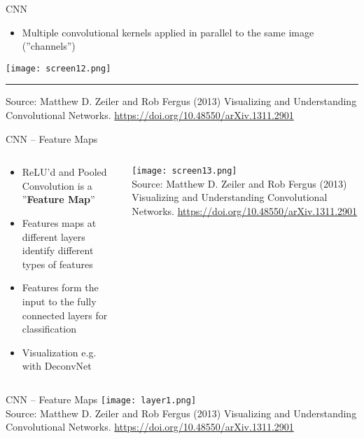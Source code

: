 \documentclass[ignorenonframetext,xcolor=x11names]{beamer}
\begin{document}
\begin{frame}{CNN}
\begin{itemize}
   \item Multiple convolutional kernels applied in parallel to the same image (''channels'')
\end{itemize} 

\vspace{\baselineskip}

\centering
\texttt{[image: screen12.png]} \\
\vspace{\baselineskip}

\hrule

\vspace{\baselineskip}
\scriptsize Source: Matthew D. Zeiler and Rob Fergus (2013) Visualizing and Understanding Convolutional Networks. \url{https://doi.org/10.48550/arXiv.1311.2901}
\end{frame}

\begin{frame}{CNN -- Feature Maps}
\begin{columns}
\begin{column}{0.5\textwidth}
\begin{itemize}
   \item ReLU'd and Pooled Convolution is a ''\textbf{Feature Map}''
   \item Features maps at different layers identify different types of features
   \item Features form the input to the fully connected layers for classification
   \item Visualization e.g. with DeconvNet
\end{itemize}
\end{column}
\begin{column}{0.5\textwidth}
\centering
\texttt{[image: screen13.png]} \\

\vspace{\baselineskip}
\scriptsize Source: Matthew D. Zeiler and Rob Fergus (2013) Visualizing and Understanding Convolutional Networks. \url{https://doi.org/10.48550/arXiv.1311.2901}
\end{column}
\end{columns}
\end{frame}

\begin{frame}{CNN -- Feature Maps}
\centering
\texttt{[image: layer1.png]} \\
\vspace{\baselineskip}
\scriptsize Source: Matthew D. Zeiler and Rob Fergus (2013) Visualizing and Understanding Convolutional Networks. \url{https://doi.org/10.48550/arXiv.1311.2901}
\end{frame}
\end{document}
